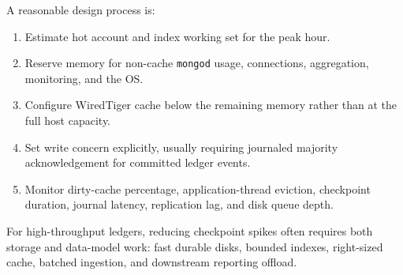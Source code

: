 A reasonable design process is:
\begin{enumerate}
    \item Estimate hot account and index working set for the peak hour.
    \item Reserve memory for non-cache \texttt{mongod} usage, connections, aggregation, monitoring, and the OS.
    \item Configure WiredTiger cache below the remaining memory rather than at the full host capacity.
    \item Set write concern explicitly, usually requiring journaled majority acknowledgement for committed ledger events.
    \item Monitor dirty-cache percentage, application-thread eviction, checkpoint duration, journal latency, replication lag, and disk queue depth.
\end{enumerate}

\begin{tipbox}
For high-throughput ledgers, reducing checkpoint spikes often requires both storage and data-model work: fast durable disks, bounded indexes, right-sized cache, batched ingestion, and downstream reporting offload.
\end{tipbox}

